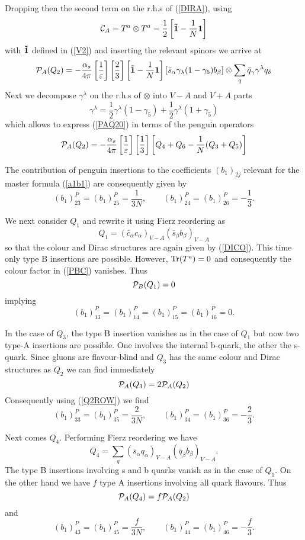 \documentclass[12pt,rotate]{article}
\def\as{\alpha_s}
\newcommand{\be}{\begin{equation}}
\newcommand{\ee}{\end{equation}}
\begin{document}
\begin{itemize}
\begin{itemize}
Dropping then the second term on the r.h.s of (\ref{DIRA}), using
\be
{\cal C}_A=T^a\otimes T^a =\frac{1}{2}
\left[{\bf \tilde 1}-\frac{1}{N} {\bf 1}\right]
\ee
with ${\bf \tilde 1}$ defined in (\ref{V2}) and inserting 
the relevant spinors
we arrive at
\be\label{PAQ20}
{\cal P}_A(Q_2)=-\frac{\as}{4\pi} 
\left[\frac{1}{\varepsilon}\right]\left[\frac{2}{3}\right]
\left[{\bf \tilde 1}-\frac{1}{N} {\bf 1}\right]
[\bar s_\alpha \gamma_\lambda (1-\gamma_5) b_\beta]\otimes
\sum_q \bar q_\gamma \gamma^\lambda q_\delta
\ee
Next we decompose $\gamma^\lambda$ on the r.h.s of $\otimes$
into $V-A$ and $V+A$ parts
\be
\gamma^\lambda=\frac{1}{2}\gamma^\lambda(1-\gamma_5)+
\frac{1}{2}\gamma^\lambda(1+\gamma_5)
\ee 
which allows to express (\ref{PAQ20}) in terms of the penguin
operators 
\be\label{PAQ2}
{\cal P}_A(Q_2)=-\frac{\as}{4\pi} 
\left[\frac{1}{\varepsilon}\right]\left[\frac{1}{3}\right]
\left[Q_4+Q_6-\frac{1}{N} (Q_3+Q_5)\right]
\ee

The contribution of penguin insertions to the coefficients $(b_1)_{2j}$ 
relevant for the master formula (\ref{a1b1})
are consequently given by
\be\label{Q2ROW}
(b_1)_{23}^P=(b_1)_{25}^P=\frac{1}{3N}, \quad\quad
(b_1)_{24}^P=(b_1)_{26}^P=-\frac{1}{3}.
\ee

We next consider $Q_1$ and rewrite it using Fierz reordering
as
\be
Q_1=(\bar c_\alpha c_\alpha)_{V-A} (\bar s_\beta b_\beta)_{V-A}
\ee
so that the colour and Dirac structures are again given by
(\ref{DICO}). This time only type B insertions are possible.
However, ${\rm Tr}(T^a)=0$ and consequently the colour factor in
(\ref{PBC}) vanishes. Thus
\be\label{PBQ1}
{\cal P}_B(Q_1)=0
\ee
implying
\be\label{Q1ROW}
(b_1)_{13}^P=(b_1)_{14}^P=
(b_1)_{15}^P=(b_1)_{16}^P=0.
\ee

In the case of $Q_3$, the type B insertion vanishes as in the case of
$Q_1$ but now two type-A insertions are possible. One involves the
internal b-quark, the other the s-quark. 
Since gluons are flavour-blind and $Q_3$ has the same colour and 
Dirac structures as $Q_2$ we can find immediately 
\be\label{PAQ3}
{\cal P}_A(Q_3)= 2 {\cal P}_A(Q_2)
\ee
Consequently using (\ref{Q2ROW}) we find
\be\label{Q3ROW}
(b_1)_{33}^P=(b_1)_{35}^P=\frac{2}{3N}, \quad\quad
(b_1)_{34}^P=(b_1)_{36}^P=-\frac{2}{3}.
\ee

Next comes $Q_4$. Performing Fierz reordering
we have
\be
Q_4=\sum_q(\bar s_\alpha q_\alpha)_{V-A} (\bar q_\beta b_\beta)_{V-A}.
\ee
The type B insertions involving s and b quarks vanish as in 
the case of $Q_1$. On the other hand we have $f$ type A insertions
involving all quark flavours. Thus
\be\label{PAQ4}
{\cal P}_A(Q_4)=f {\cal P}_A(Q_2) 
\ee
and
\be\label{Q4ROW}
(b_1)_{43}^P=(b_1)_{45}^P=\frac{f}{3N}, \quad\quad
(b_1)_{44}^P=(b_1)_{46}^P=-\frac{f}{3}.
\ee


\end{itemize}
\end{itemize}
\end{document}
